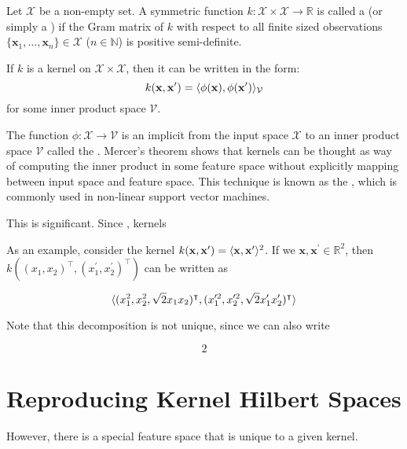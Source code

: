 \begin{definition}
Let $\mathcal{X}$ be a non-empty set. A symmetric function $k : \mathcal{X} \times \mathcal{X} \to \mathbb{R}$ is called a  (or simply a ) if the Gram matrix of $k$ with respect to all finite sized observations $\{ \mathbf{x}_1, \dotsc, \mathbf{x}_n \} \in \mathcal{X}$ ($n \in \mathbb{N}$) is positive semi-definite.
\end{definition}

\begin{theorem}
If $k$ is a kernel on $\mathcal{X} \times \mathcal{X}$, then it can be written in the form:
\begin{equation}
  k(\mathbf{x}, \mathbf{x}^\prime) = \langle\phi(\mathbf{x}), \phi(\mathbf{x}^\prime)\rangle_\mathcal{V}
\end{equation}
for some inner product space $\mathcal{V}$.
\end{theorem}

The function $\phi : \mathcal{X} \to \mathcal{V}$ is an implicit  from the input space $\mathcal{X}$ to an inner product space $\mathcal{V}$ called the . Mercer's theorem shows that kernels can be thought as way of computing the inner product in some feature space without explicitly mapping between input space and feature space. This technique is known as the , which is commonly used in non-linear support vector machines.

This is significant. Since , kernels 

As an example, consider the kernel $k(\mathbf{x}, \mathbf{x}^\prime) = \langle\mathbf{x}, \mathbf{x}^\prime\rangle^2$. If we $\mathbf{x}, \mathbf{x}^\prime \in \mathbb{R}^2$, then $k((x_1, x_2)^\intercal, (x_1^\prime, x_2^\prime)^\intercal)$ can be written as

\begin{equation}
\langle(x_1^2, x_2^2, \sqrt{2} x_1 x_2)^\intercal, (x_1^{\prime 2}, x_2^{\prime 2}, \sqrt{2} x_1^\prime x_2^\prime)^\intercal\rangle
\end{equation}

Note that this decomposition is not unique, since we can also write

\begin{equation}
2
\end{equation}

\section{Reproducing Kernel Hilbert Spaces}
However, there is a special feature space that is unique to a given kernel. 

